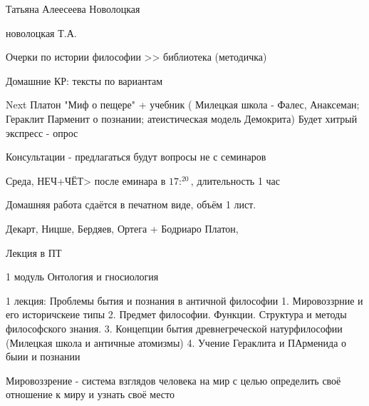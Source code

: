 \documentclass[a4paper,12pt]{report}
\begin{document}
	\def \nocredits {}
	\def \LineE {Конспект по дисциплине}
	\def \LineF {Философия}

	\maketitle












	Татьяна Алеесеева Новолоцкая


	новолоцкая Т.А.

	Очерки по истории философии >> библиотека (методичка)

	Домашние КР: тексты по вариантам

	Next Платон "Миф о пещере"
	+ учебник ( Милецкая школа - Фалес, Анаксеман; Гераклит Парменит о познании; атеистическая модель Демокрита)
	Будет хитрый экспресс - опрос


	Консультации - предлагаться будут вопросы не с семинаров

	Среда, НЕЧ+ЧЁТ> после еминара в $17:^{20}$, длительность 1 час

	Домашняя работа сдаётся в печатном виде, объём 1 лист.

	Декарт, Ницше, Бердяев, Ортега + Бодриаро
	Платон,


	Лекция в ПТ


	1 модуль Онтология и гносиология

	1 лекция:
	Проблемы бытия и познания в античной философии
		1. Мировоззрние и его историчскеие типы
		2. Предмет философии. Функции. Структура и методы философского знания.
		3. Концепции бытия древнегреческой натурфилософии (Милецкая школа и античные атомизмы)
		4. Учение Гераклита и ПАрменида о быии и познании

	Мировоззрение - система взглядов человека на мир с целью определить своё отношение к миру и узнать своё место
\end{document}
